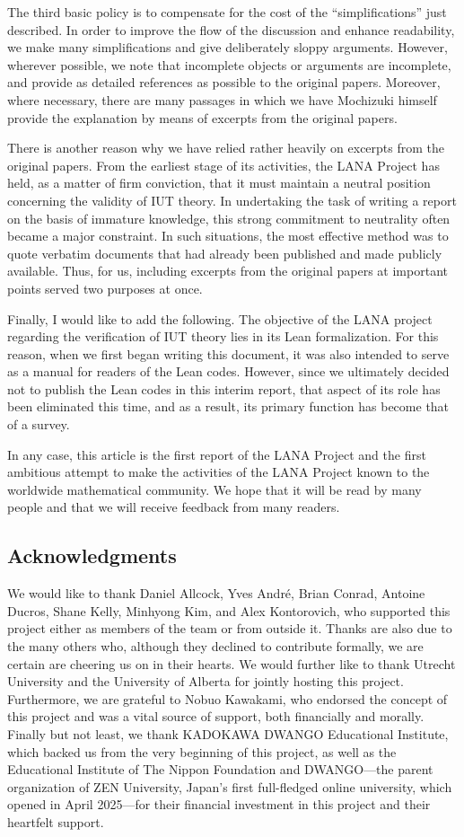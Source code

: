 \documentclass[12pt, reqno, a4paper]{amsart}
\begin{document}
The third basic policy is to compensate for the cost of the ``simplifications'' just described. In order to improve the flow of the discussion and enhance readability, we make many simplifications and give deliberately sloppy arguments. However, wherever possible, we note that incomplete objects or arguments are incomplete, and provide as detailed references as possible to the original papers. Moreover, where necessary, there are many passages in which we have Mochizuki himself provide the explanation by means of excerpts from the original papers.

There is another reason why we have relied rather heavily on excerpts from the original papers. From the earliest stage of its activities, the LANA Project has held, as a matter of firm conviction, that it must maintain a neutral position concerning the validity of IUT theory. In undertaking the task of writing a report on the basis of immature knowledge, this strong commitment to neutrality often became a major constraint. In such situations, the most effective method was to quote verbatim documents that had already been published and made publicly available. Thus, for us, including excerpts from the original papers at important points served two purposes at once.

Finally, I would like to add the following. The objective of the LANA project regarding the verification of IUT theory lies in its Lean formalization. For this reason, when we first began writing this document, it was also intended to serve as a manual for readers of the Lean codes. However, since we ultimately decided not to publish the Lean codes in this interim report, that aspect of its role has been eliminated this time, and as a result, its primary function has become that of a survey.

In any case, this article is the first report of the LANA Project and the first ambitious attempt to make the activities of the LANA Project known to the worldwide mathematical community. We hope that it will be read by many people and that we will receive feedback from many readers.


\subsection*{Acknowledgments}
We would like to thank Daniel Allcock, Yves Andr\'e, Brian Conrad, Antoine Ducros, Shane Kelly, Minhyong Kim, and Alex Kontorovich, who supported this project either as members of the team or from outside it. Thanks are also due to the many others who, although they declined to contribute formally, we are certain are cheering us on in their hearts. We would further like to thank Utrecht University and the University of Alberta for jointly hosting this project. Furthermore, we are grateful to Nobuo Kawakami, who endorsed the concept of this project and was a vital source of support, both financially and morally. Finally but not least, we thank KADOKAWA DWANGO Educational Institute, which backed us from the very beginning of this project, as well as the Educational Institute of The Nippon Foundation and DWANGO---the parent organization of ZEN University, Japan's first full-fledged online university, which opened in April 2025---for their financial investment in this project and their heartfelt support.
\end{document}
